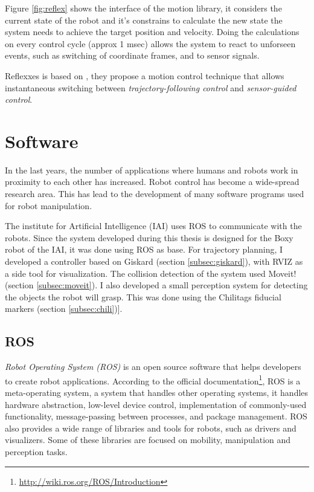 Figure \ref{fig:reflex} shows the interface of the motion library, it considers the current state of the robot and it's constrains to calculate the new state the system needs to achieve the target position and velocity. Doing the calculations on every control cycle (approx 1 msec) allows the system to react to unforseen events, such as switching of coordinate frames, and to sensor signals.

Reflexxes is based on \citet{reflexxes_theory}, they propose a motion control technique that allows instantaneous switching between \textit{trajectory-following control} and  \textit{sensor-guided control}.


\section{Software}
In the last years, the number of applications where humans and robots work in proximity to each other has increased. Robot control has become a wide-spread research area. This has lead to the development of many software programs used for robot manipulation. 

The  institute for Artificial Intelligence (IAI) uses ROS to communicate with the robots. Since the system developed during this thesis is designed for the Boxy robot of the IAI, it was done using ROS as base. For trajectory planning, I developed a controller based on Giskard (section \ref{subsec:giskard}), with RVIZ as a side tool for visualization. The collision detection of the system used Moveit! (section \ref{subsec:moveit}). I also developed a small perception system for detecting the objects the robot will grasp. This was done using the Chilitags fiducial markers (section \ref{subsec:chili})].

\subsection{ROS}
\label{sec:ros}

\textit{Robot Operating System (ROS)} is an open source software that helps developers to create robot applications. According to the official documentation\footnote{\url{http://wiki.ros.org/ROS/Introduction}}, ROS is a meta-operating system, a system that handles other operating systems, it handles hardware abstraction, low-level device control, implementation of commonly-used functionality, message-passing between processes, and package management. ROS also provides a wide range of libraries and tools for robots, such as drivers and visualizers. Some of these libraries are focused on mobility, manipulation and perception tasks.

